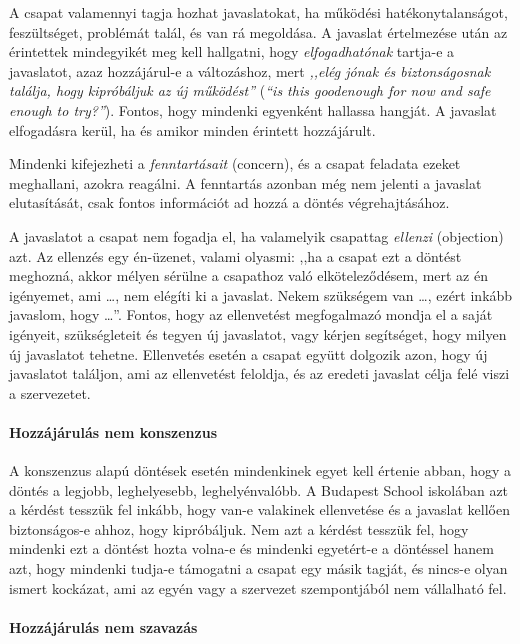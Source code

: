 A csapat valamennyi tagja hozhat javaslatokat, ha működési hatékonytalanságot, feszültséget, problémát talál, és van rá megoldása. A javaslat értelmezése után az érintettek mindegyikét meg kell hallgatni, hogy \emph{elfogadhatónak} tartja-e a javaslatot, azaz hozzájárul-e a változáshoz, mert \emph{,,elég jónak és biztonságosnak találja, hogy
  kipróbáljuk az új működést''} (\emph{``is this good\break enough for now and
  safe enough to try?''}). Fontos, hogy mindenki egyenként hallassa hangját. A javaslat elfogadásra kerül, ha és amikor minden érintett hozzájárult.

Mindenki kifejezheti a \emph{fenntartásait} (concern), és a csapat feladata ezeket meghallani, azokra reagálni. A fenntartás azonban még nem jelenti a javaslat elutasítását, csak fontos információt ad hozzá a döntés végrehajtásához.

A javaslatot a csapat nem fogadja el, ha valamelyik csapattag \emph{ellenzi} (objection) azt. Az ellenzés egy én-üzenet, valami olyasmi: ,,ha a csapat ezt a döntést meghozná, akkor mélyen sérülne a csapathoz való elköteleződésem, mert az én igényemet, ami \ldots{}, nem elégíti ki a javaslat. Nekem szükségem van \ldots{}, ezért inkább javaslom, hogy \ldots{}''. Fontos, hogy az ellenvetést megfogalmazó mondja el a saját igényeit, szükségleteit és tegyen új javaslatot, vagy kérjen segítséget, hogy milyen új javaslatot tehetne. Ellenvetés esetén a csapat együtt dolgozik azon, hogy új javaslatot találjon, ami az ellenvetést feloldja, és az eredeti javaslat célja felé viszi a szervezetet.

\paragraph{Hozzájárulás nem konszenzus}

A konszenzus alapú döntések esetén mindenkinek egyet kell értenie abban, hogy a döntés a legjobb, leghelyesebb, leghelyénvalóbb. A Budapest School iskolában azt a kérdést tesszük fel inkább, hogy van-e valakinek ellenvetése és a javaslat kellően biztonságos-e ahhoz, hogy kipróbáljuk. Nem azt a kérdést tesszük fel, hogy mindenki ezt a döntést hozta volna-e és mindenki egyetért-e a döntéssel hanem azt, hogy mindenki tudja-e támogatni a csapat egy másik tagját, és nincs-e olyan ismert kockázat, ami az egyén vagy a szervezet szempontjából nem vállalható fel.

\paragraph{Hozzájárulás nem szavazás}

